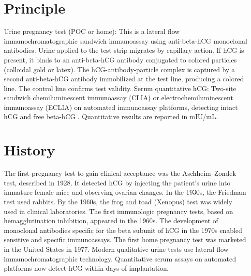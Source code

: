 \section*{Principle}
Urine pregnancy test (POC or home): This is a lateral flow immunochromatographic sandwich immunoassay using anti-beta-hCG monoclonal antibodies. Urine applied to the test strip migrates by capillary action. If hCG is present, it binds to an anti-beta-hCG antibody conjugated to colored particles (colloidal gold or latex). The hCG-antibody-particle complex is captured by a second anti-beta-hCG antibody immobilized at the test line, producing a colored line. The control line confirms test validity. Serum quantitative hCG: Two-site sandwich chemiluminescent immunoassay (CLIA) or electrochemiluminescent immunoassay (ECLIA) on automated immunoassay platforms, detecting intact hCG and free beta-hCG \cite{cole1997immunoassay}. Quantitative results are reported in mIU/mL.
\section*{History}
The first pregnancy test to gain clinical acceptance was the Aschheim--Zondek test, described in 1928. It detected hCG by injecting the patient's urine into immature female mice and observing ovarian changes. In the 1930s, the Friedman test used rabbits. By the 1960s, the frog and toad (Xenopus) test was widely used in clinical laboratories. The first immunologic pregnancy tests, based on hemagglutination inhibition, appeared in the 1960s. The development of monoclonal antibodies specific for the beta subunit of hCG in the 1970s enabled sensitive and specific immunoassays. The first home pregnancy test was marketed in the United States in 1977. Modern qualitative urine tests use lateral flow immunochromatographic technology. Quantitative serum assays on automated platforms now detect hCG within days of implantation.
